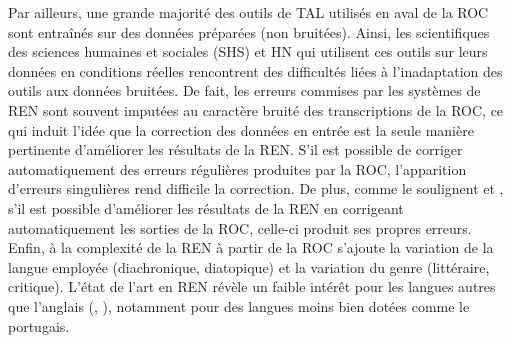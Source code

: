 Par ailleurs, une grande majorité des outils de TAL utilisés en aval de la ROC sont entraînés sur des données préparées (non bruitées). Ainsi, les scientifiques des sciences humaines et sociales (SHS) et HN qui utilisent ces outils sur leurs données en conditions réelles rencontrent des difficultés liées à l'inadaptation des outils aux données bruitées. De fait, les erreurs commises par les systèmes de REN sont souvent imputées au caractère bruité des transcriptions de la ROC, ce qui induit l'idée que la correction des données en entrée est la seule manière pertinente d'améliorer les résultats de la REN. 
S'il est possible de corriger automatiquement des erreurs régulières produites par la ROC, l'apparition d’erreurs singulières rend difficile la correction. De plus, comme le soulignent \cite{huynh:hal-03034484} et \cite{petkovic:hal-04063970}, s'il est possible d'améliorer les résultats de la REN en corrigeant automatiquement les sorties de la ROC, celle-ci produit ses propres erreurs. Enfin, à la complexité de la REN à partir de la ROC s'ajoute la variation de la langue employée (diachronique, diatopique) %
et la variation du genre (littéraire, critique). L'état de l'art en REN révèle un faible intérêt pour les langues autres que l’anglais (\cite{lejeune:hal-01294127}, \cite{rahimi-etal-2019-massively}), notamment pour des langues moins bien dotées comme le portugais.

